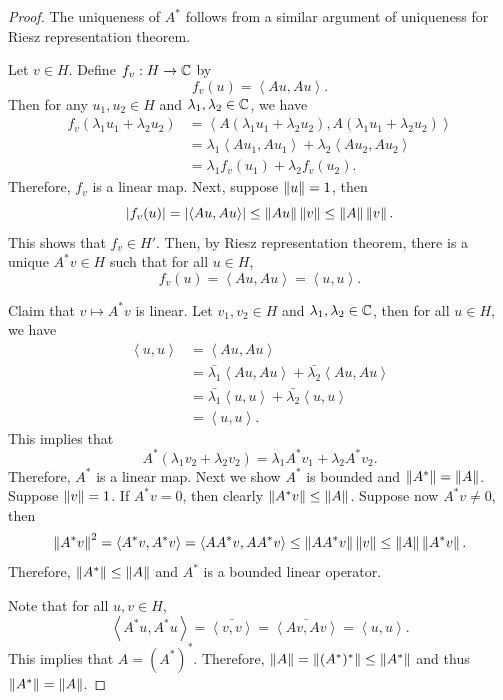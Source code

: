 \documentclass[a4paper]{article}
\renewcommand{\braket}[2]{\left\langle #1, #1 \right\rangle}
\begin{document}
\begin{proof}
The uniqueness of $A^*$ follows from a similar argument 
of uniqueness for Riesz representation theorem. 

Let $v \in H$. Define $f_v : H \to \mathbb{C}$ by 
\[
f_v(u) = \braket{A u}{v}.
\]
Then for any $u_1, u_2 \in H$ and $\lambda_1, \lambda_2 \in \mathbb{C}$,
we have 
\[
\begin{aligned}
  f_v(\lambda_1 u_1 + \lambda_2 u_2) 
  &= \braket{A (\lambda_1 u_1 + \lambda_2 u_2)}{v} \\
  &= \lambda_1 \braket{A u_1}{v} + \lambda_2 \braket{A u_2}{v} \\
  &= \lambda_1 f_v(u_1) + \lambda_2 f_v(u_2).
\end{aligned}
\]
Therefore, $f_v$ is a linear map. Next, 
suppose $\left\lVert u\right\rVert = 1$, then 
\[
\abs{f_v(u)} = \abs{\braket{Au}{v}} 
\leq \norm{Au}\norm{v} \leq \norm{A} \norm{v}.
\]
This shows that $f_v \in H'$. Then, by Riesz
representation theorem, there is a unique $A^* v \in H$
such that for all $u \in H$, 
\[
f_v(u) = \braket{Au}{v} = \braket{u}{A^* v}.
\]

Claim that $v \mapsto A^* v$ is linear. Let $v_1, v_2 \in H$
and $\lambda_1, \lambda_2 \in \mathbb{C}$, then for all $u \in H$, 
we have 
\[
\begin{aligned}
  \braket{u}{A^*(\lambda_1 v_2 + \lambda_2 v_2)}
  &= \braket{Au}{\lambda_1 v_2 + \lambda_2 v_2} \\
  &= \bar{\lambda_1} \braket{Au}{v_1} + \bar{\lambda_2} 
  \braket{Au}{v_2} \\
  &= \bar{\lambda_1} \braket{u}{A^* v_1} + \bar{\lambda_2} 
  \braket{u}{A^* v_2} \\
  &= \braket{u}{\lambda_1 A^* v_1 + \lambda_2 A^* v_2}.
\end{aligned}
\]
This implies that 
\[
  A^* (\lambda_1 v_2 + \lambda_2 v_2)
  = \lambda_1 A^* v_1 + \lambda_2 A^* v_2.
\]
Therefore, $A^*$ is a linear map. Next we show 
$A^*$ is bounded and $\left\lVert A^*\right\rVert = \left\lVert A\right\rVert$. Suppose 
$\left\lVert v\right\rVert = 1$. If $A^* v = 0$, then clearly $\left\lVert A^* v\right\rVert
\leq \left\lVert A\right\rVert$. Suppose now $A^* v \neq 0$, then 
\[
\norm{A^* v}^2 = \braket{A^* v}{A^* v} 
= \braket{A A^* v}{v} \leq \norm{A A^* v} \norm{v} 
\leq \norm{A} \norm{A^* v}.
\]
Therefore, $\left\lVert A^*\right\rVert \leq \left\lVert A\right\rVert$ and $A^*$ is a bounded 
linear operator. 

Note that for all $u, v \in H$, 
\[
\braket{A^* u}{v} = \bar{\braket{v}{A^* u}} 
= \bar{\braket{A v}{u}} = \braket{u}{A v}.
\]
This implies that $A = \left( A^* \right)^*$. 
Therefore, $\left\lVert A\right\rVert = \left\lVert (A^*)^*\right\rVert \leq \left\lVert A^*\right\rVert$
and thus $\left\lVert A^*\right\rVert = \left\lVert A\right\rVert$.
\end{proof}
\end{document}
